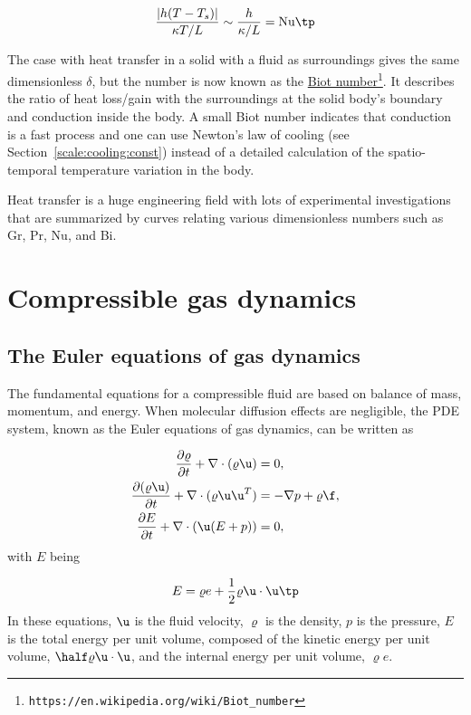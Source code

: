 \documentclass[graybox,envcountchap,sectrefs,final]{svmonodo}
\begin{document}
\[ \frac{|h(T-T_s)|}{\kappa T/L} \sim \frac{h}{\kappa /L} = \hbox{Nu}\tp\]

The case with heat transfer in a solid with a fluid as surroundings
gives the same dimensionless $\delta$, but the number is now known as
the \href{{https://en.wikipedia.org/wiki/Biot_number}}{Biot number}\footnote{\texttt{https://en.wikipedia.org/wiki/Biot\_number}}. It
describes the ratio of heat loss/gain with the surroundings at the
solid body's boundary and conduction inside the body. A small Biot
number indicates that conduction is a fast process and one can use
Newton's law of cooling (see Section~\ref{scale:cooling:const})
instead of a detailed calculation of the
spatio-temporal temperature variation in the body.

Heat transfer is a huge engineering
field with lots of experimental investigations
that are summarized by curves relating various dimensionless numbers
such as Gr, Pr, Nu, and Bi.


\section{Compressible gas dynamics}
\label{scale:gasdyn}

\subsection{The Euler equations of gas dynamics}
\label{scale:Euler_eqs}



The fundamental equations for a compressible fluid are based on balance
of mass, momentum, and energy. When molecular diffusion effects are
negligible, the PDE system, known as the Euler
equations of gas dynamics, can be written as

\begin{align}
\frac{\partial\varrho}{\partial t} + \nabla\cdot(\varrho\u) &= 0,
\label{scale:Euler_eqs:mass}\\ 
\frac{\partial(\varrho\u)}{\partial t} + \nabla\cdot(\varrho\u\u^T) &= -\nabla p + \varrho \f,
\label{scale:Euler_eqs:mom}\\ 
\frac{\partial E}{\partial t} + \nabla\cdot(\u(E+p)) &= 0,
\label{scale:Euler_eqs:energy}
\end{align}
with $E$ being

\begin{equation}
E = \varrho e + \frac{1}{2}\varrho\u\cdot\u\tp
\label{scale:Euler_eqs:E}
\end{equation}
In these equations, $\u$ is the fluid velocity, $\varrho$ is the density,
$p$ is the pressure, $E$ is the total energy per unit volume, composed
of the kinetic energy per unit volume, $\half\varrho \u\cdot\u$, and the
internal energy per unit volume, $\varrho e$.
\end{document}

